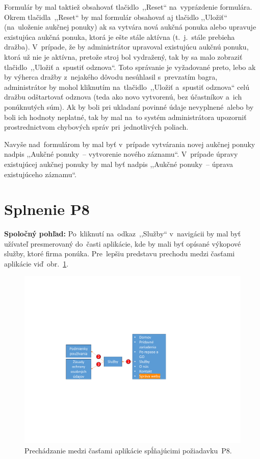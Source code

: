Formulár by mal taktiež obsahovať tlačidlo~,,Reset`` na~vyprázdenie formulára. Okrem tlačidla~,,Reset`` by mal formulár obsahovať aj tlačidlo ,,Uložiť`` (na~uloženie aukčnej ponuky) ak sa vytvára nová aukčná ponuka alebo upravuje existujúca aukčná ponuka, ktorá je ešte stále aktívna (t.~j.~stále prebieha dražba). V~prípade, že by administrátor upravoval existujúcu aukčnú ponuku, ktorá už nie je aktívna, pretože stroj bol vydražený, tak by sa malo zobraziť tlačidlo~,,Uložiť a~spustiť odznova``. Toto správanie je vyžadované preto, lebo ak by výherca dražby z~nejakého dôvodu nesúhlasil s~prevzatím bagra, administrátor by mohol kliknutím na~tlačidlo~,,Uložiť a~spustiť odznova`` celú dražbu odštartovať odznova (teda ako novo vytvorenú, bez účastníkov a~ich ponúknutých súm). Ak by boli pri ukladaní povinné údaje nevyplnené~alebo by boli ich hodnoty neplatné, tak by mal na~to systém administrátora upozorniť prostrednictvom chybových správ pri~jednotlivých poliach.

Navyše nad~formulárom by mal byť v~prípade vytvárania novej aukčnej ponuky nadpis ,,Aukčné ponuky~-- vytvorenie nového záznamu``. V~prípade úpravy existujúcej aukčnej ponuky by mal byť nadpis ,,Aukčné ponuky~-- úprava existujúceho záznamu``.

\section{Splnenie P8}
\label{splnenie p8}

\textbf{Spoločný pohľad:} Po~kliknutí na~odkaz~,,Služby`` v~navigácii by mal byť užívateľ presmerovaný do~časti aplikácie, kde by mali byť opísané výkopové služby, ktoré firma ponúka. Pre~lepšiu predstavu prechodu medzi časťami aplikácie viď~obr.~\ref{p8 graph}. 

\begin{figure}[H]\centering
\includegraphics[width=140mm]{../img/UI concept/p8 graph}
\caption{Prechádzanie medzi časťami aplikácie spĺňajúcimi požiadavku~P8.}
\label{p8 graph}
\end{figure}


